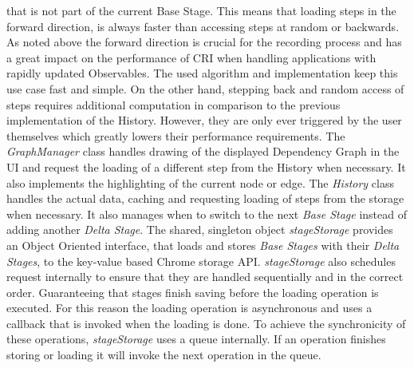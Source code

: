that is not part of the current Base Stage. This means that loading steps in the forward direction, is always faster than accessing steps at random or backwards. As noted above the forward direction is crucial for the recording process and has a great impact on the performance of CRI when handling applications with rapidly updated Observables. The used algorithm and implementation keep this use case fast and simple. On the other hand, stepping back and random access of steps requires additional computation in comparison to the previous implementation of the History. However, they are only ever triggered by the user themselves which greatly lowers their performance requirements.
The \emph{GraphManager} class handles drawing of the displayed Dependency Graph in the UI and request the loading of a different step from the History when necessary. It also implements the highlighting of the current node or edge. The \emph{History} class handles the actual data, caching and requesting loading of steps from the storage when necessary. It also manages when to switch to the next \emph{Base Stage} instead of adding another \emph{Delta Stage}. The shared, singleton object \emph{stageStorage} provides an Object Oriented interface, that loads and stores \emph{Base Stages} with their \emph{Delta Stages}, to the key-value based Chrome storage API. \emph{stageStorage} also schedules request internally to ensure that they are handled sequentially and in the correct order. Guaranteeing that stages finish saving before the loading operation is executed. For this reason the loading operation is asynchronous and uses a callback that is invoked when the loading is done. To achieve the synchronicity of these operations, \emph{stageStorage} uses a queue internally. If an operation finishes storing or loading it will invoke the next operation in the queue.	
	
